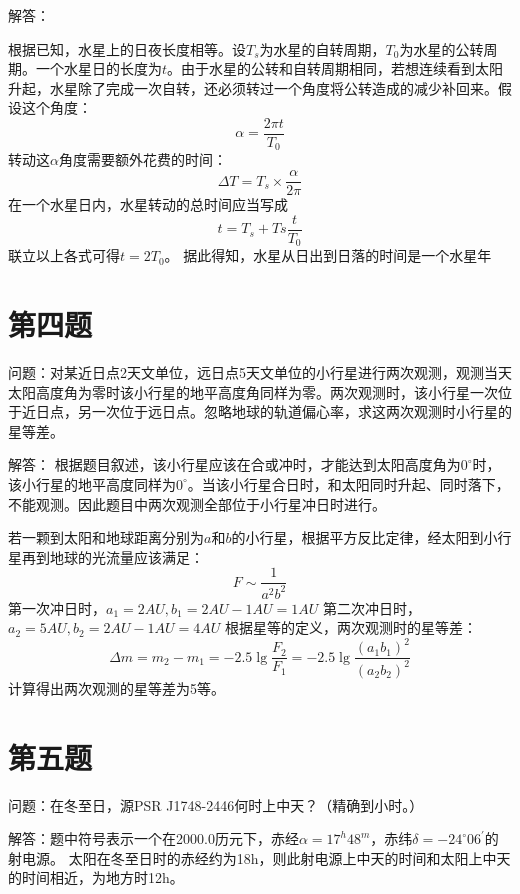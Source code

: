 \documentclass[a4paper,12pt]{report}
\begin{document}
\noindent 解答：

根据已知，水星上的日夜长度相等。设$T_{s}$为水星的自转周期，$T_{0}$为水星的公转周期。一个水星日的长度为$t$。由于水星的公转和自转周期相同，若想连续看到太阳升起，水星除了完成一次自转，还必须转过一个角度将公转造成的减少补回来。假设这个角度：
\begin{equation}
	\alpha=\frac{2\pi t}{T_{0}}
\end{equation}
转动这$\alpha$角度需要额外花费的时间：
\begin{equation}
	\Delta T=T_{s}\times \frac{\alpha}{2\pi}
\end{equation}
在一个水星日内，水星转动的总时间应当写成
\begin{equation}
	t=T_{s}+T{s}\frac{t}{T_{0}}
\end{equation}
联立以上各式可得$t=2T_{0}$。
据此得知，水星从日出到日落的时间是一个水星年

\section{第四题}
\noindent 问题：对某近日点2天文单位，远日点5天文单位的小行星进行两次观测，观测当天太阳高度角为零时该小行星的地平高度角同样为零。两次观测时，该小行星一次位于近日点，另一次位于远日点。忽略地球的轨道偏心率，求这两次观测时小行星的星等差。

\noindent 解答：
根据题目叙述，该小行星应该在合或冲时，才能达到太阳高度角为$0^\circ$时，该小行星的地平高度同样为$0^\circ$。当该小行星合日时，和太阳同时升起、同时落下，不能观测。因此题目中两次观测全部位于小行星冲日时进行。

若一颗到太阳和地球距离分别为$a$和$b$的小行星，根据平方反比定律，经太阳到小行星再到地球的光流量应该满足：
\begin{equation}
	F\sim \frac{1}{a^2 b^2}
\end{equation}
第一次冲日时，$a_{1}=2AU,b_{1}=2AU-1AU=1AU$
第二次冲日时，$a_{2}=5AU,b_{2}=2AU-1AU=4AU$
根据星等的定义，两次观测时的星等差：
\begin{equation}
	\Delta m =m_{2}-m_{1}=-2.5\lg \frac{F_{2}}{F_{1}}=-2.5\lg \frac{(a_{1}b_{1})^2}{(a_{2}b_{2})^2}
\end{equation}
计算得出两次观测的星等差为5等。
\section{第五题}
\noindent 问题：在冬至日，源PSR J1748-2446何时上中天？（精确到小时。）

\noindent 解答：题中符号表示一个在2000.0历元下，赤经$\alpha =17^h 48^m$，赤纬$\delta = -24^\circ 06^\prime$的射电源。
太阳在冬至日时的赤经约为18h，则此射电源上中天的时间和太阳上中天的时间相近，为地方时12h。
\end{document}

